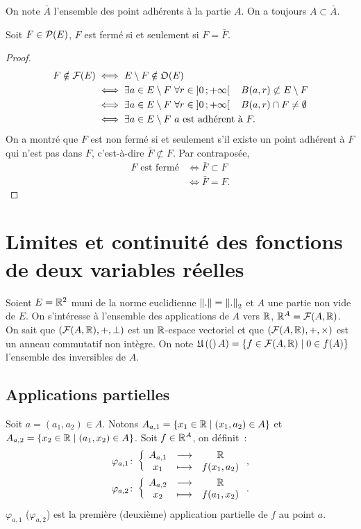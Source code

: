 On note $\bar{A}$ l'ensemble des point adhérents à la partie $A$. On a toujours $A \subset \bar{A}$.

\begin{prop}
  Soit $F \in \P(E)$, $F$ est fermé si et seulement si $F=\bar{F}$.
\end{prop}
\begin{proof}
  \begin{align}
    F \notin \F(E) &\iff E\setminus F \notin \Oouvert(E) \\
    &\iff \exists a \in E\setminus F \ \forall r \in \Rplusetoile \quad B(a, r) \not\subset E\setminus F \\
    &\iff \exists a \in E\setminus F \ \forall r \in \Rplusetoile \quad B(a, r) \cap F \neq \emptyset \\
    &\iff \exists a \in E\setminus F \ a \text{~est adhérent à~} F.
  \end{align}
  On a montré que $F$ est non fermé si et seulement s'il existe un point adhérent à $F$ qui n'est pas dans $F$, c'est-à-dire $\bar{F} \not\subset F$. Par contraposée,
  \begin{align}
    F \text{~est fermé} &\iff \bar{F} \subset F \\
    &\iff \bar{F}=F.
  \end{align}
\end{proof}

\section{Limites et continuité des fonctions de deux variables réelles}

Soient $E=\R^2$ muni de la norme euclidienne $\norme{.}=\norme{.}_2$ et $A$ une partie non vide de $E$. On s'intéresse à l'ensemble des applications de $A$ vers $\R$, $\R^A=\F(A, \R)$. On sait que $(\F(A, \R), +, \perp)$ est un $\R$-espace vectoriel et que $(\F(A, \R), +, \times)$ est un anneau commutatif non intègre. On note $\uinv(A)=\enstq{f \in \F(A, \R)}{0 \in f(A)}$ l'ensemble des inversibles de $A$.

\subsection{Applications partielles}

Soit $a=(a_1, a_2) \in A$. Notons $A_{a, 1}=\enstq{x_1 \in \R}{(x_1, a_2) \in A}$ et $A_{a, 2}=\enstq{x_2 \in \R}{(a_1, x_2) \in A}$. Soit $f \in \R^A$, on définit~:
\begin{gather}
  \fonction{\varphi_{a, 1}}{A_{a, 1}}{\R}{x_1}{f(x_1, a_2)}, \\ \fonction{\varphi_{a, 2}}{A_{a, 2}}{\R}{x_2}{f(a_1, x_2)}.
\end{gather}
$\varphi_{a, 1}$ ($\varphi_{a, 2}$) est la première (deuxième) application partielle de $f$ au point $a$.

